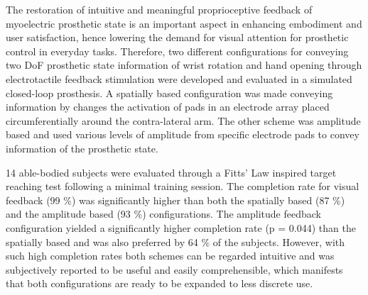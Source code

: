 The restoration of intuitive and meaningful proprioceptive feedback of myoelectric prosthetic state is an important aspect in enhancing embodiment and user satisfaction, hence lowering the demand for visual attention for prosthetic control in everyday tasks. Therefore, two different configurations for conveying two DoF prosthetic state information of wrist rotation and hand opening through electrotactile feedback stimulation were developed and evaluated in a simulated closed-loop prosthesis. A spatially based configuration was made conveying information by changes the activation of pads in an electrode array placed circumferentially around the contra-lateral arm. The other scheme was amplitude based and used various levels of amplitude from specific electrode pads to convey information of the prosthetic state. 

14 able-bodied subjects were evaluated through a Fitts' Law inspired target reaching test following a minimal training session. The completion rate for visual feedback (99 $\%$) was significantly higher than both the spatially based (87 $\%$) and the amplitude based (93 $\%$) configurations. The amplitude feedback configuration yielded a significantly higher completion rate (p = 0.044) than the spatially based and was also preferred by 64 $\%$ of the subjects. However, with such high completion rates both schemes can be regarded intuitive and was subjectively reported to be useful and easily comprehensible, which manifests that both configurations are ready to be expanded to less discrete use.    
